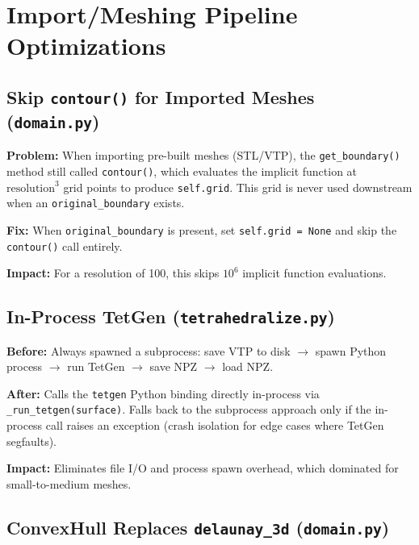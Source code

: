 \documentclass[11pt,a4paper]{article}
\begin{document}
\section{Import/Meshing Pipeline Optimizations}

\subsection{Skip \texttt{contour()} for Imported Meshes (\texttt{domain.py})}

\textbf{Problem:} When importing pre-built meshes (STL/VTP), the \texttt{get\_boundary()} method still called \texttt{contour()}, which evaluates the implicit function at $\text{resolution}^3$ grid points to produce \texttt{self.grid}. This grid is never used downstream when an \texttt{original\_boundary} exists.

\textbf{Fix:} When \texttt{original\_boundary} is present, set \texttt{self.grid = None} and skip the \texttt{contour()} call entirely.

\textbf{Impact:} For a resolution of 100, this skips $10^6$ implicit function evaluations.

\subsection{In-Process TetGen (\texttt{tetrahedralize.py})}

\textbf{Before:} Always spawned a subprocess: save VTP to disk $\to$ spawn Python process $\to$ run TetGen $\to$ save NPZ $\to$ load NPZ.

\textbf{After:} Calls the \texttt{tetgen} Python binding directly in-process via \texttt{\_run\_tetgen(surface)}. Falls back to the subprocess approach only if the in-process call raises an exception (crash isolation for edge cases where TetGen segfaults).

\textbf{Impact:} Eliminates file I/O and process spawn overhead, which dominated for small-to-medium meshes.

\subsection{ConvexHull Replaces \texttt{delaunay\_3d} (\texttt{domain.py})}
\end{document}
